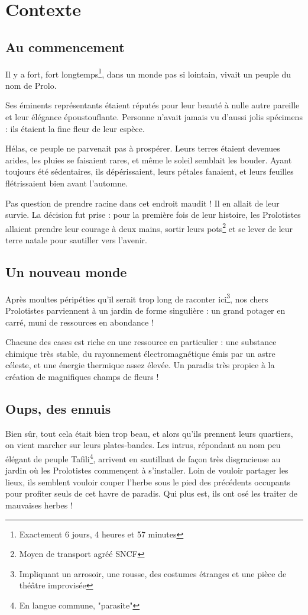 \section{Contexte}
\subsection{Au commencement}
Il y a fort, fort longtemps\footnote{Exactement 6 jours, 4 heures et 57 minutes}, dans un monde pas si lointain, vivait un peuple du nom de Prolo.

Ses éminents représentants étaient réputés pour leur beauté à nulle autre pareille et leur élégance époustouflante. Personne n'avait jamais vu d'aussi jolis spécimens : ils étaient la fine fleur de leur espèce. 

Hélas, ce peuple ne parvenait pas à prospérer. Leurs terres étaient devenues arides, les pluies se faisaient rares, et même le soleil semblait les bouder. Ayant toujours été sédentaires, ils dépérissaient, leurs pétales fanaient, et leurs feuilles flétrissaient bien avant l'automne. 

Pas question de prendre racine dans cet endroit maudit ! Il en allait de leur survie. La décision fut prise : pour la première fois de leur histoire, les Prolotistes allaient prendre leur courage à deux mains, sortir leurs pots\footnote{Moyen de transport agréé SNCF} et se lever de leur terre natale pour sautiller vers l'avenir.

\subsection{Un nouveau monde}
Après moultes péripéties qu'il serait trop long de raconter ici\footnote{Impliquant un arrosoir, une rousse, des costumes étranges et une pièce de théâtre improvisée}, nos chers Prolotistes parviennent à un jardin de forme singulière : un grand potager en carré, muni de ressources en abondance ! 

Chacune des cases est riche en une ressource en particulier : une substance chimique très stable, du rayonnement électromagnétique émis par un astre céleste, et une énergie thermique assez élevée. Un paradis très propice à la création de magnifiques champs de fleurs ! 
\newpage

\subsection{Oups, des ennuis}
Bien sûr, tout cela était bien trop beau, et alors qu'ils prennent leurs quartiers, on vient marcher sur leurs plates-bandes. Les intrus, répondant au nom peu élégant de peuple Tafili\footnote{En langue commune, "parasite"}, arrivent en sautillant de façon très disgracieuse au jardin où les Prolotistes commençent à s'installer. Loin de vouloir partager les lieux, ils semblent vouloir couper l'herbe sous le pied des précédents occupants pour profiter seuls de cet havre de paradis. Qui plus est, ils ont osé les traiter de mauvaises herbes ! 

